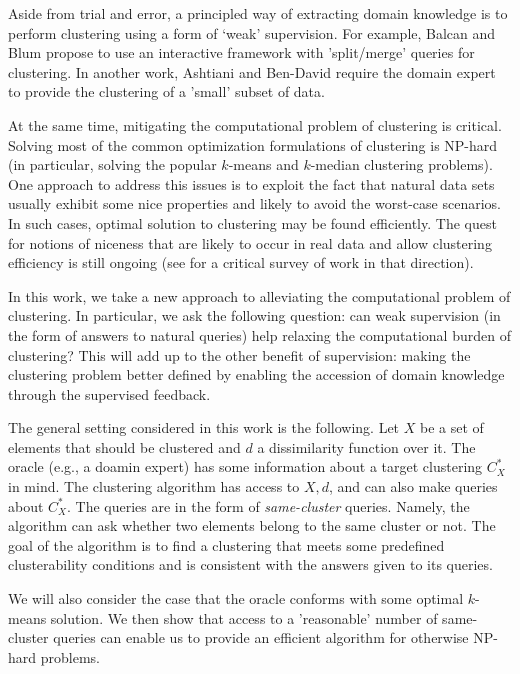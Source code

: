 \documentclass{article}
\begin{document}
Aside from trial and error, a principled way of extracting domain knowledge is to perform clustering using a form of `weak' supervision. For example, Balcan and Blum \cite{balcan2008clustering} propose to use an interactive framework with 'split/merge' queries for clustering. In another work, Ashtiani and Ben-David \cite{ashtiani2015representation} require the domain expert to provide the clustering of a 'small' subset of data.

At the same time, mitigating the computational problem of clustering is critical. Solving most of the common optimization formulations of clustering is NP-hard (in particular, solving the popular $k$-means and $k$-median clustering problems). One approach to address this issues is to exploit the fact that natural data sets usually exhibit some nice properties and likely to avoid the worst-case scenarios. In such cases, optimal solution to clustering may be found efficiently. The quest for notions of niceness that are likely to occur in real data and allow clustering efficiency is still ongoing (see \cite{Ben-David15} for a critical survey of work in that direction).

In this work, we take a new approach to alleviating the computational problem of clustering. In particular, we ask the following question: can weak supervision (in the form of answers to natural queries) help relaxing the computational burden of clustering? This will add up to the other benefit of supervision: making the clustering problem better defined by enabling the accession of domain knowledge through the supervised feedback.

The general setting considered in this work is the following. Let $X$ be a set of elements that should be clustered and $d$ a dissimilarity function over it. The oracle (e.g., a doamin expert) has some information about a  target clustering $C^*_X$ in mind. The clustering algorithm has access to $X, d$, and can also make queries about $C^*_X$. The queries are in the form of \emph{same-cluster} queries. Namely, the algorithm can ask whether two elements belong to the same cluster or not. The goal of the algorithm is to find a clustering that meets some predefined clusterability conditions and is consistent with the answers given to its queries. 

We will also consider the case that the oracle conforms with some optimal $k$-means solution. We then show that access to a 'reasonable' number of same-cluster queries can enable us to provide an efficient algorithm for otherwise NP-hard problems. 
\end{document}
